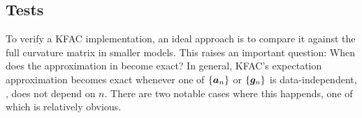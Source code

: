 \begin{comment}
Using the same optimality condition and arguments, it is straightforward to show that:
\begin{align*}
  \argmin_{\mK}
  &\left\lVert
  \cvec \mG_{n,c} (\cvec \mG_{n,c})^{\top} - \mK \otimes \mI_{D_{\text{out}}}
  \right\rVert_2 \\
  &=
  \frac{1}{S} \mG_{n,c} \mG_{n,c}^{\top}.
\end{align*}
This result tells us that the optimal Kronecker approximation is again obtained by averaging the diagonal blocks of size $S\times S$, simplifying the curvature matrix to:
\begin{align*}
  \mC(\cvec\mW)
  &\approx
  R \sum_n \sum_c
  \mZ_n \mZ_n^{\top} \otimes \frac{1}{S} \mG_{n,c} \mG_{n,c}^{\top}
  \\
  &= R \sum_n \sum_s \vz_{n,s} \vz_{n,s}^{\top} \\
  &\quad\otimes \sum_{s'} \sum_c \frac{1}{S} \vg_{n,s',c} \vg_{n,s',c}^{\top}
  \intertext{Applying KFAC's expectation approximation from \Cref{def:kfac_exp_approx}, we obtain}
  &\approx
  \left(R \sum_n \sum_s \vz_{n,s} \vz_{n,s}^{\top}\right)
  \\
  &\quad\otimes \left( \frac{\textcolor{VectorOrange}{\sum_n} \textcolor{VectorTeal}{\sum_s}\sum_c \vg_{n,s,c} \vg_{n,s,c}^{\top}}{\textcolor{VectorOrange}{N} \textcolor{VectorTeal}{S}} \right).
\end{align*}
This equation highlighs that the sequence dimension (highlighted in \textcolor{VectorTeal}{teal}) is treated exactly like the batch dimension (highlighted in \textcolor{VectorOrange}{orange}) in KFAC's expectation approximation.
Consequently, if no additional reduction occurs along the sequence dimension, it can be flattened into the batch dimension without affecting the approximation structure.
\end{comment}

\subsection{Tests}

To verify a KFAC implementation, an ideal approach is to compare it against the full curvature matrix in smaller models.
This raises an important question: When does the approximation in  become exact?
In general, KFAC's expectation approximation becomes exact whenever one of $\{{\bm{a}}_n\}$ or $\{{\bm{g}}_n\}$ is data-independent, \ie, does not depend on $n$.
There are two notable cases where this happends, one of which is relatively obvious.


